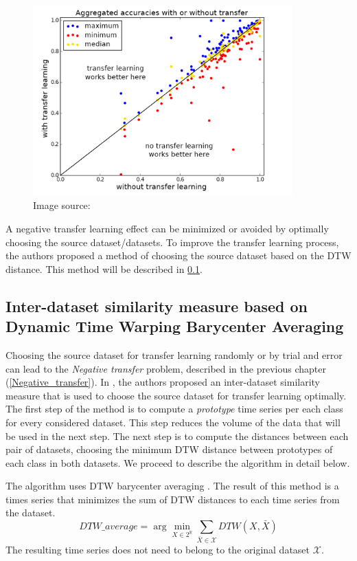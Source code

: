 \documentclass[a4paper,11pt,twoside]{report}
\theoremstyle{definition}
\DeclareMathOperator{\real}{\mathbb{R}}
\begin{document}
\begin{figure}[h!]
\centering
\includegraphics[width=10cm]{imgs/max_min_transfer_learning.png}
\caption{Image source: \cite{transfer_learning_time_series}}
\label{fig:tr_learning_min_max}
\end{figure}
\FloatBarrier
A negative transfer learning effect can be minimized or avoided by optimally choosing the source dataset/datasets. To improve the transfer learning process, the authors proposed a method of choosing the source dataset based on the DTW distance. This method will be described in \ref{DTW_choosing}.

\subsection{Inter-dataset similarity measure based on Dynamic Time Warping Barycenter Averaging} \label{DTW_choosing}
Choosing the source dataset for transfer learning randomly or by trial and error can lead to the \textit{Negative transfer} problem, described in the previous chapter (\ref{Negative_transfer}). In \cite{transfer_learning_time_series}, the authors proposed an inter-dataset similarity measure that is used to choose the source dataset for transfer learning optimally. The first step of the method is to compute a \textit{prototype} time series per each class for every considered dataset. This step reduces the volume of the data that will be used in the next step. The next step is to compute the distances between each pair of datasets, choosing the minimum DTW distance between prototypes of each class in both datasets. We proceed to describe the algorithm in detail below.

The algorithm uses DTW barycenter averaging \cite{dtw_dba}. The result of this method is a times series that minimizes the sum of DTW distances to each time series from the dataset.
$$DTW\_average = \arg\min_{X \in  2^{\real}}  \sum_{\bar{X}\in \mathcal{X}} DTW(X, \bar{X})$$
The resulting time series does not need to belong to the original dataset $\mathcal{X}$.
\end{document}
